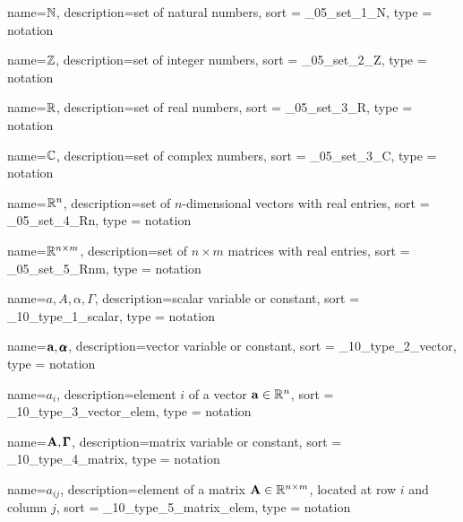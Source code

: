


{
  name={\ensuremath{\N}},
  description={set of natural numbers},
  sort = _05_set_1_N,
  type = notation
}

{
  name={\ensuremath{\Z}},
  description={set of integer numbers},
  sort = _05_set_2_Z,
  type = notation
}

{
  name={\ensuremath{\R}},
  description={set of real numbers},
  sort = _05_set_3_R,
  type = notation
}

{
  name={\ensuremath{\C}},
  description={set of complex numbers},
  sort = _05_set_3_C,
  type = notation
}

{
  name={\ensuremath{\R^n}},
  description={set of $n$-dimensional vectors with real entries},
  sort = _05_set_4_Rn,
  type = notation
}

{
  name={\ensuremath{\R^{n\times m}}},
  description={set of $n \times m$ matrices with real entries},
  sort = _05_set_5_Rnm,
  type = notation
}


{
  name={\ensuremath{a,A,\alpha,\Gamma}},
  description={scalar variable or constant},
  sort = _10_type_1_scalar,
  type = notation
}

{
  name={\ensuremath{\bvec{a},\gvec{\alpha}}},
  description={vector variable or constant},
  sort = _10_type_2_vector,
  type = notation
}

{
  name={\ensuremath{a_i}},
  description={element $i$ of a vector $\mathbf{a}\in\mathbb{R}^n$},
  sort = _10_type_3_vector_elem,
  type = notation
}

{
  name={\ensuremath{\mat{A},\gmat{\Gamma}}},
  description={matrix variable or constant},
  sort = _10_type_4_matrix,
  type = notation
}

{
  name={\ensuremath{a_{ij}}},
  description={element of a matrix $\mathbf{A}\in\mathbb{R}^{n\times m}$, located at row $i$ and column $j$},
  sort = _10_type_5_matrix_elem,
  type = notation
}

